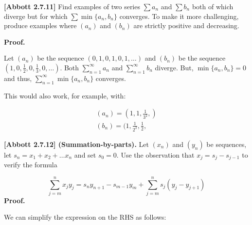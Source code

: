\documentclass[10pt]{article}
\begin{document}
\textbf{[Abbott 2.7.11] }Find examples of two series $\displaystyle \sum a_{n}$ and $\displaystyle \sum b_{n}$ both of which diverge but for which $\displaystyle \sum \min\{a_{n} ,b_{n}\}$ converges. To make it more challenging, produce examples where $\displaystyle ( a_{n})$ and $\displaystyle ( b_{n})$ are strictly positive and decreasing.



\textbf{Proof.}



Let $\displaystyle ( a_{n})$ be the sequence $\displaystyle ( 0,1,0,1,0,1,\dotsc )$ and $\displaystyle ( b_{n})$ be the sequence $\displaystyle \left( 1,0,\frac{1}{2} ,0,\frac{1}{3} ,0,\dotsc \right)$. Both $\displaystyle \sum _{n=1}^{\infty } a_{n}$ and $\displaystyle \sum _{n=1}^{\infty } b_{n}$ diverge. But, $\displaystyle \min\{a_{n} ,b_{n}\} =0$ and thus, $\displaystyle \sum _{n=1}^{\infty }\min\{a_{n} ,b_{n}\}$ converges.



This would also work, for example, with:




\begin{gather*}
( a_{n}) =\left( 1,1,\frac{1}{3^{2}} ,\right)\\
( b_{n}) =( 1,\frac{1}{2^{2}} ,\frac{1}{2} ,
\end{gather*}


\textbf{[Abbott 2.7.12] (Summation-by-parts). }Let $\displaystyle ( x_{n})$ and $\displaystyle ( y_{n})$ be sequences, let $\displaystyle s_{n} =x_{1} +x_{2} +\dotsc x_{n}$ and set $\displaystyle s_{0} =0$. Use the observation that $\displaystyle x_{j} =s_{j} -s_{j-1}$ to verify the formula 




\begin{equation*}
\sum _{j=m}^{n} x_{j} y_{j} =s_{n} y_{n+1} -s_{m-1} y_{m} +\sum _{j=m}^{n} s_{j}( y_{j} -y_{j+1})
\end{equation*}
\textbf{Proof.}



We can simplify the expression on the RHS as follows:
\end{document}
